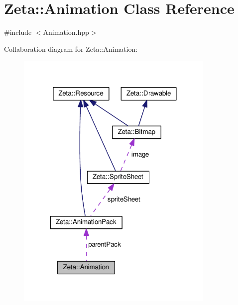 \hypertarget{classZeta_1_1Animation}{\section{Zeta\+:\+:Animation Class Reference}
\label{classZeta_1_1Animation}
}


{\ttfamily \#include $<$Animation.\+hpp$>$}



Collaboration diagram for Zeta\+:\+:Animation\+:
\nopagebreak
\begin{figure}[H]
\begin{center}
\leavevmode
\includegraphics[width=269pt]{classZeta_1_1Animation__coll__graph}
\end{center}
\end{figure}
